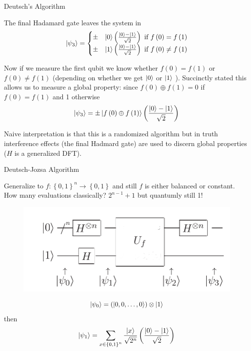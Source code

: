 \documentclass{beamer}
\begin{document}
\begin{frame}{Deutsch's Algorithm}

The final Hadamard gate leaves the system in
\[
\Ket{\psi_{3}}=\begin{cases}
\pm & \Ket{0}\left(\frac{\Ket{0}-\Ket{1}}{\sqrt{2}}\right)\text{ if }f\left(0\right)=f\left(1\right)\\
\pm & \Ket{1}\left(\frac{\Ket{0}-\Ket{1}}{\sqrt{2}}\right)\text{ if }f\left(0\right)\neq f\left(1\right)
\end{cases}
\]

Now if we measure the first qubit we know whether $f\left(0\right)=f\left(1\right)$
or $f\left(0\right)\neq f\left(1\right)$ (depending on whether we get $\Ket{0}$ or $\Ket{1}$ ). Succinctly stated this allows us to measure a global property: since $f\left(0\right)\oplus f\left(1\right)=0$ if $f\left(0\right)=f\left(1\right)$ and 1 otherwise
\[
\Ket{\psi_{3}}=\pm\Ket{f\left(0\right)\oplus f\left(1\right)}\left(\frac{\Ket{0}-\Ket{1}}{\sqrt{2}}\right)
\] 

Naive interpretation is that this is a randomized algorithm but in truth interference effects (the final Hadmard gate)
are used to discern global properties ($H$ is a generalized DFT).
 

\end{frame}

\begin{frame}{Deutsch-Jozsa Algorithm}

Generalize to $f:\left\{ 0,1\right\} ^{n}\to\left\{ 0,1\right\} $ and still $f$ is either balanced or constant.
How many evaluations classically? $2^{n-1}+1$ but quantumly still 1!
 
\begin{figure}[ht]
  \includegraphics[scale=0.33]{pasted2}
\end{figure}

\[
\Ket{\psi_{0}}=\left(\Ket{0,0,\dots,0}\right)\otimes\Ket{1}
\]
 then 
\[
\Ket{\psi_{1}}=\sum_{x\in\left\{ 0,1\right\} ^{n}}\frac{\Ket{x}}{\sqrt{2^{n}}}\left(\frac{\Ket{0}-\Ket{1}}{\sqrt{2}}\right)
\]

\end{frame}
\end{document}
